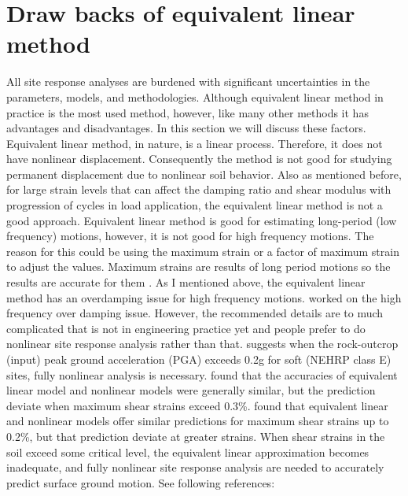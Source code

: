 
\section{Draw backs of equivalent linear method}

All site response analyses are burdened with significant uncertainties in the parameters, models, and methodologies. 
Although equivalent linear method in practice is the most used method, however, like many other methods it has advantages and disadvantages. In this section we will discuss these factors. Equivalent linear method, in nature, is a linear process. Therefore, it does not have nonlinear displacement. Consequently the method is not good for studying permanent displacement due to nonlinear soil behavior. Also as mentioned before, for large strain levels that can affect the damping ratio and shear modulus with progression of cycles in load application, the equivalent linear method is not a good approach. Equivalent linear method is good for estimating long-period (low frequency) motions, however, it is not good for high frequency motions. The reason for this could be using the maximum strain or a factor of maximum strain to adjust the values. Maximum strains are results of long period motions so the results are accurate for them \citep{Kaklamanos2013critical}. 
As I mentioned above, the equivalent linear method has an overdamping issue for high frequency motions. \citep{Sugito1994frequency,Joyner1998equivalent,Assimaki2002equivalent,Park2008rate} worked on the high frequency over damping issue. However, the recommended details are to much complicated that is not in engineering practice yet and people prefer to do nonlinear site response analysis rather than that. \citet{Assimaki2008quantifying} suggests when the rock-outcrop (input) peak ground acceleration (PGA) exceeds 0.2g for soft (NEHRP class E) sites, fully nonlinear analysis is necessary. \citet{Kim2013site} found that the accuracies of equivalent linear model and nonlinear models were generally similar, but the prediction deviate when maximum shear strains exceed 0.3\%. \citet{Yee2013elastic} found that equivalent linear and nonlinear models offer similar predictions for maximum shear strains up to 0.2\%, but that prediction deviate at greater strains. When shear strains in the soil exceed some critical level, the equivalent linear approximation becomes inadequate, and fully nonlinear site response analysis are needed to accurately predict surface ground motion. See following references: \citep{Assimaki2008quantifying,Kwok2008,Kaklamanos2013critical,Kim2013site,Yee2013elastic,Matasovic2010,Hashash2016deepsoil}\\

